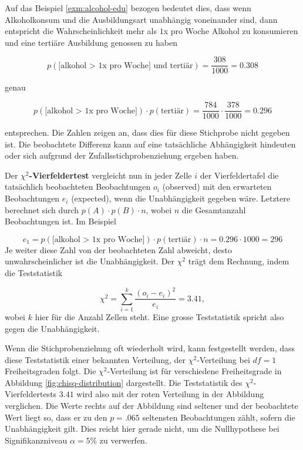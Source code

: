 \documentclass[
]{book}
\theoremstyle{definition}
\theoremstyle{definition}
\theoremstyle{definition}
\theoremstyle{definition}
\theoremstyle{remark}
\begin{document}
Auf das Beispiel \ref{exm:alcohol-edu} bezogen bedeutet dies, dass wenn
Alkoholkonsum und die Ausbildungsart unabhängig voneinander sind, dann
entspricht die Wahrscheinlichkeit mehr als \(1\)x pro Woche Alkohol zu
konsumieren und eine tertiäre Ausbildung genossen zu haben

\[
p(\text{[alkohol > 1x pro Woche] und tertiär}) = \frac{308}{1000} = 0.308
\]

genau

\[
p(\text{[alkohol > 1x pro Woche]}) \cdot p(\text{tertiär}) = 
\frac{
  784
  }{
  1000} 
\cdot 
\frac{
  378
}{
  1000
} = 
0.296
\]

entsprechen. Die Zahlen zeigen an, dass dies für diese Stichprobe
nicht gegeben ist. Die beobachtete Differenz kann auf eine tatsächliche Abhängigkeit hindeuten oder sich aufgrund der Zufallsstichprobenziehung ergeben haben.

Der \label{customdef-vierfeldertest}{\textbf{\(\chi^2\)-Vierfeldertest}}
vergleicht nun in jeder Zelle \(i\) der Vierfeldertafel die tatsächlich
beobachteten Beobachtungen \(o_i\) (observed) mit den erwarteten
Beobachtungen \(e_i\) (expected), wenn die Unabhängigkeit gegeben wäre.
Letztere berechnet sich durch \(p(A) \cdot p(B) \cdot n\), wobei \(n\) die
Gesamtanzahl Beobachtungen ist. Im Beispiel

\[e_1 = 
p(\text{[alkohol > 1x pro Woche]}) \cdot p(\text{tertiär}) \cdot n =
0.296
\cdot  
  1000 
= 
  296 \]
Je weiter diese Zahl von der beobachteten Zahl abweicht, desto
unwahrscheinlicher ist die Unabhängigkeit. Der \(\chi^2\) trägt dem
Rechnung, indem die Teststatistik

\[\chi^2 = \sum_{i = 1}^k \frac{(o_i - e_i)^2}{e_i} = 3.41,\]
wobei \(k\) hier für die Anzahl Zellen steht. Eine grosse Teststatistik
spricht also gegen die Unabhängigkeit.

Wenn die Stichprobenziehung oft wiederholt wird, kann festgestellt
werden, dass diese Teststatistik einer bekannten Verteilung, der
\(\chi^2\)-Verteilung bei \(df = 1\) Freiheitsgraden folgt. \label{customdef-chisq-distribution}{Die
\(\chi^2\)-Verteilung ist für verschiedene Freiheitsgrade in Abbildung
\ref{fig:chisq-distribution}
dargestellt.}
Die Teststatistik des \(\chi^2\)-Vierfeldertests
\(3.41\) wird also mit
der roten Verteilung in der Abbildung verglichen. Die Werte rechts auf
der Abbildung sind seltener und der beobachtete Wert liegt so, dass er
zu den \(p = .065\)
seltensten Beobachtungen zählt, sofern die Unabhängigkeit gilt. Dies
reicht hier gerade nicht, um die Nullhypothese bei Signifikanzniveau
\(\alpha = 5\%\) zu verwerfen.
\end{document}
